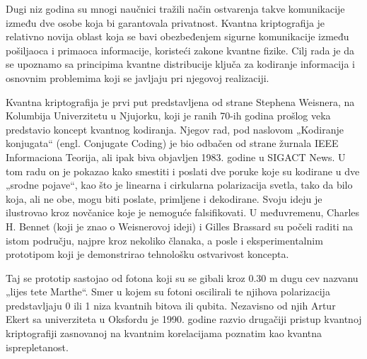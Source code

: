 \documentclass[a4paper]{article}
\begin{document}
{Dugi niz godina su mnogi naučnici tražili način ostvarenja takve komunikacije između dve osobe koja bi garantovala privatnost.  Kvantna kriptografija je relativno novija oblast koja se bavi obezbeđenjem sigurne komunikacije između pošiljaoca i primaoca informacije, koristeći zakone kvantne fizike. Cilj rada je da se upoznamo sa principima kvantne distribucije ključa za kodiranje informacija i osnovnim problemima koji se javljaju pri njegovoj realizaciji. 

Kvantna kriptografija je prvi put predstavljena od strane Stephena Weisnera, na Kolumbija Univerzitetu u Njujorku, koji je ranih 70-ih godina prošlog veka predstavio koncept kvantnog kodiranja. Njegov rad, pod naslovom „Kodiranje konjugata“ (engl. Conjugate Coding) je bio odbačen od strane žurnala IEEE Informaciona Teorija, ali ipak biva objavljen 1983. godine u SIGACT News. U tom radu on je pokazao kako smestiti i poslati dve poruke koje su kodirane u dve „srodne pojave“, kao što je linearna i cirkularna polarizacija svetla, tako da bilo koja, ali ne obe, mogu biti poslate, primljene i dekodirane. Svoju ideju je ilustrovao kroz novčanice koje je nemoguće falsifikovati.  U međuvremenu, Charles H. Bennet (koji je znao o Weisnerovoj ideji) i Gilles Brassard su počeli raditi na istom području, najpre kroz nekoliko članaka, a posle i eksperimentalnim prototipom koji je demonstrirao tehnološku ostvarivost koncepta. 

Taj se prototip sastojao od fotona koji su se gibali kroz 0.30 m dugu cev nazvanu „lijes tete Marthe“. Smer u kojem su fotoni oscilirali te njihova polarizacija predstavljaju 0 ili 1 niza kvantnih bitova ili qubita. Nezavisno od njih Artur Ekert sa univerziteta u Oksfordu je 1990. godine razvio drugačiji pristup kvantnoj kriptografiji zasnovanoj na kvantnim korelacijama poznatim kao kvantna isprepletanost.
}
\end{document}
